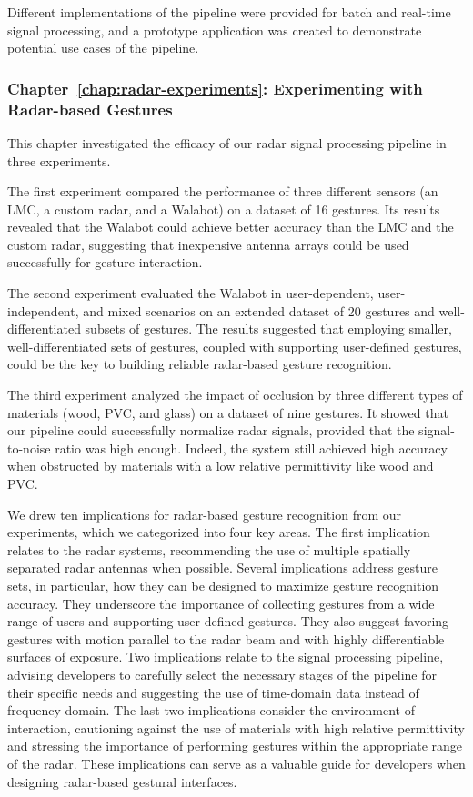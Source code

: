 Different implementations of the pipeline were provided for batch and real-time signal processing, and a prototype application was created to demonstrate potential use cases of the pipeline.


\subsubsection{Chapter~\ref{chap:radar-experiments}: Experimenting with Radar-based Gestures}
This chapter investigated the efficacy of our radar signal processing pipeline in three experiments.

The first experiment compared the performance of three different sensors (an LMC, a custom radar, and a Walabot) on a dataset of 16 gestures. Its results revealed that the Walabot could achieve better accuracy than the LMC and the custom radar, suggesting that inexpensive antenna arrays could be used successfully for gesture interaction.

The second experiment evaluated the Walabot in user-dependent, user-independent, and mixed scenarios on an extended dataset of 20 gestures and well-differentiated subsets of gestures. The results suggested that employing smaller, well-differentiated sets of gestures, coupled with supporting user-defined gestures, could be the key to building reliable radar-based gesture recognition. 

The third experiment analyzed the impact of occlusion by three different types of materials (wood, PVC, and glass) on a dataset of nine gestures. It showed that our pipeline could successfully normalize radar signals, provided that the signal-to-noise ratio was high enough. Indeed, the system still achieved high accuracy when obstructed by materials with a low relative permittivity like wood and PVC.

We drew ten implications for radar-based gesture recognition from our experiments, which we categorized into four key areas. 
%
The first implication relates to the radar systems, recommending the use of multiple spatially separated radar antennas when possible.
%
Several implications address gesture sets, in particular, how they can be designed to maximize gesture recognition accuracy. They underscore the importance of collecting gestures from a wide range of users and supporting user-defined gestures. They also suggest favoring gestures with motion parallel to the radar beam and with highly differentiable surfaces of exposure.
%
Two implications relate to the signal processing pipeline, advising developers to carefully select the necessary stages of the pipeline for their specific needs and suggesting the use of time-domain data instead of frequency-domain.
%
The last two implications consider the environment of interaction, cautioning against the use of materials with high relative permittivity and stressing the importance of performing gestures within the appropriate range of the radar.
%
These implications can serve as a valuable guide for developers when designing radar-based gestural interfaces. 

